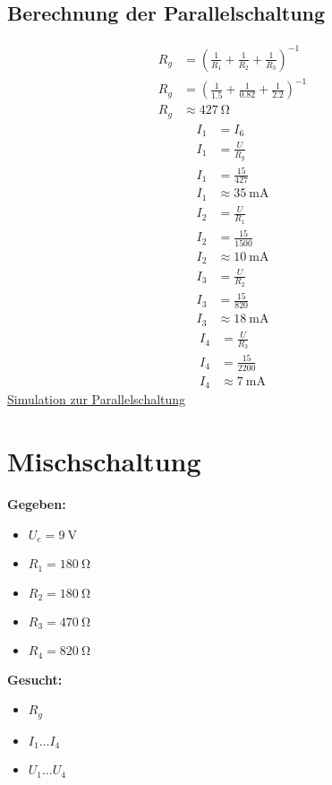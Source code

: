 \documentclass[12pt,a4paper]{amsart}
\begin{document}
\subsection{Berechnung der Parallelschaltung}
\begin{align*}
  R_g&=\left(\frac{1}{R_1}+\frac{1}{R_2}+\frac{1}{R_3}\right)^{-1}\\
  R_g&=\left(\frac{1}{1.5}+\frac{1}{0.82}+\frac{1}{2.2}\right)^{-1}\\
  R_g&\approx \qty{427}{\ohm}
\end{align*}
\begin{align*}
  I_1&=I_6\\
  I_1&=\frac{U}{R_g}\\
  I_1&=\frac{15}{427}\\
  I_1&\approx \qty{35}{\mA}
\end{align*}
\begin{align*}
  I_2&=\frac{U}{R_1}\\
  I_2&=\frac{15}{1500}\\
  I_2&\approx \qty{10}{\mA}
\end{align*}
\begin{align*}
  I_3&=\frac{U}{R_2}\\
  I_3&=\frac{15}{820}\\
  I_3&\approx \qty{18}{\mA}
\end{align*}
\begin{align*}
  I_4&=\frac{U}{R_3}\\
  I_4&=\frac{15}{2200}\\
  I_4&\approx \qty{7}{\mA}
\end{align*}
\href{https://www.falstad.com/circuit/circuitjs.html?ctz=CQAgjCAMB0l3BWcMBMcUHYMGZIA4UA2ATmIxAUgoqoQFMBaMMAKADcQ8rMVOrjCUIQBZ+QqjAQsATuEJUww4XO6ihYSpBkgUCQYuW7BKNVTxhi0UtZs3t2BLwMgHvExJ1otAdxUgBOnr+gj6BggGuwVAsvmDy4Eo6+AnKoUYpLpDKzqFxqtzJ7tG+6UW4hqYxLo4ZogqJoZFFdTqVsfFFeToYvGlBRaU9xdVuak1DfcZDXTzD4279EywADpnZieWtCuIrIC3OLZ07q2h4Gadb4Du+XFFdAazt3EO3s49+D-HO7+kB6d9VSIRGoAoA}{Simulation zur Parallelschaltung}
\section{Mischschaltung}
\textbf{Gegeben:}
\begin{itemize}
\item $U_e = \qty{9}{\volt}$
\item $R_1 = \qty{180}{\ohm}$
\item $R_2 = \qty{180}{\ohm}$
\item $R_3 = \qty{470}{\ohm}$
\item $R_4 = \qty{820}{\ohm}$
\end{itemize}
\textbf{Gesucht:}
\begin{itemize}
\item $R_g$
\item $I_1 \dots I_4$
\item $U_1 \dots U_4$
\end{itemize}
\end{document}
